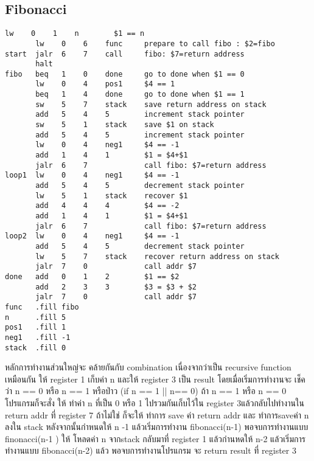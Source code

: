 \documentclass[14pt]{article}
\begin{document}
\newpage
\subsection{Fibonacci}
\begin{lstlisting}[style=assembly]
       lw    0    1    n        $1 == n     
       lw    0    6    func     prepare to call fibo : $2=fibo 
start  jalr  6    7    call     fibo: $7=return address
       halt
fibo   beq   1    0    done     go to done when $1 == 0
       lw    0    4    pos1     $4 == 1
       beq   1    4    done     go to done when $1 == 1
       sw    5    7    stack    save return address on stack
       add   5    4    5        increment stack pointer
       sw    5    1    stack    save $1 on stack
       add   5    4    5        increment stack pointer
       lw    0    4    neg1     $4 == -1
       add   1    4    1        $1 = $4+$1
       jalr  6    7             call fibo: $7=return address
loop1  lw    0    4    neg1     $4 == -1
       add   5    4    5        decrement stack pointer
       lw    5    1    stack    recover $1
       add   4    4    4        $4 == -2
       add   1    4    1        $1 = $4+$1
       jalr  6    7             call fibo: $7=return address
loop2  lw    0    4    neg1     $4 == -1
       add   5    4    5        decrement stack pointer
       lw    5    7    stack    recover return address on stack
       jalr  7    0             call addr $7
done   add   0    1    2        $1 == $2
       add   2    3    3        $3 = $3 + $2
       jalr  7    0             call addr $7
func   .fill fibo
n      .fill 5
pos1   .fill 1
neg1   .fill -1
stack  .fill 0   
\end{lstlisting}
\par หลักการทำงานส่วนใหญ่จะ คล้ายกันกับ combination เนื่องจากว่าเป็น recursive function เหมือนกัน 
ให้ register 1 เก็บค่า n   และให้ register 3 เป็น result 
โดยเมื่อเริ่มการทำงานจะ เช็คว่า n ==  0 หรือ n == 1  หรือป่าว (if n == 1 || n== 0)
ถ้า n == 1 หรือ n == 0 โปรแกรมก็จะสั่ง ให้ ทำค่า n ที่เป็น 0 หรือ 1 ไปรวมกันเก็บไว้ใน register 3แล้วกลับไปทำงานใน return addr ที่ register 7 
ถ้าไม่ใช่ ก็จะให้ ทำการ save ค่า return addr และ ทำการsaveค่า n ลงใน stack หลังจากนั้นกำหนดให้ n -1 แล้วเริ่มการทำงาน fibonacci(n-1)
พอจบการทำงานแบบ finonacci(n-1 ) ให้ โหลดค่า n จากstack กลับมาที่ register 1 แล้วกำนหดให้ n-2 แล้วเริ่มการทำงานแบบ fibonacci(n-2) 
แล้ว พอจบการทำงานโปรแกรม จะ return result ที่ register 3 

\newpage
\vspace*{\fill}
\noindent
{}
\end{document}
